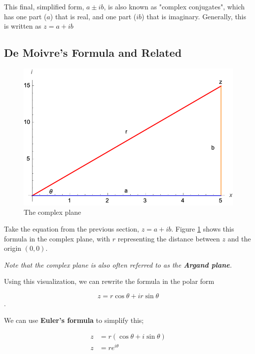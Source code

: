 \documentclass[12pt]{article}
\begin{document}
This final, simplified form, $a \pm ib$, is also known as "complex conjugates", which has one part ($a$) that is real, and one part ($ib$) that is imaginary. Generally, this is written as $z = a + ib$

\subsection{De Moivre's Formula and Related}

\begin{figure}
    \centering
    \includegraphics{misc/imaginary.png}
    \caption{The complex plane}
    \label{fig:imaginary}
\end{figure}

Take the equation from the previous section, $z = a + ib$. Figure \ref{fig:imaginary} shows this formula in the complex plane, with $r$ representing the distance between $z$ and the origin $(0,0)$.

\begin{center}
\begin{shaded*}
    \textit{Note that the complex plane is also often referred to as the \textbf{Argand plane}.}
\end{shaded*}
\end{center}

Using this visualization, we can rewrite the formula in the polar form

$$z = r \cos \theta + i r \sin \theta$$.

We can use \textbf{Euler's formula} to simplify this;

\begin{equation}
    \begin{split}
        z &= r(\cos \theta + i \sin \theta)\\
        z &= r e^{i\theta}
    \end{split}
\end{equation}
\end{document}
